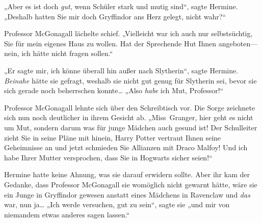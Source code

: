 „Aber es ist doch \emph{gut}, wenn Schüler stark und mutig sind“, sagte Hermine. „Deshalb hatten Sie mir doch Gryffindor ans Herz gelegt, nicht wahr?“

Professor McGonagall lächelte schief. „Vielleicht war ich auch nur selbstsüchtig, Sie für mein eigenes Haus zu wollen. Hat der Sprechende Hut Ihnen angeboten—nein, ich hätte nicht fragen sollen.“

„Er sagte mir, ich könne überall hin außer nach Slytherin“, sagte Hermine. \emph{Beinahe} hätte sie gefragt, weshalb sie nicht gut genug für Slytherin sei, bevor sie sich gerade noch beherrschen konnte… „Also \emph{habe} ich Mut, Professor!“

Professor McGonagall lehnte sich über den Schreibtisch vor. Die Sorge zeichnete sich nun noch deutlicher in ihrem Gesicht ab. „Miss~Granger, hier geht es nicht um Mut, sondern darum was für junge Mädchen auch gesund ist! Der Schulleiter zieht Sie in seine Pläne mit hinein, Harry Potter vertraut Ihnen seine Geheimnisse an und jetzt schmieden Sie Allianzen mit Draco Malfoy! Und ich habe Ihrer Mutter versprochen, dass Sie in Hogwarts sicher seien!“

Hermine hatte keine Ahnung, was sie darauf erwidern sollte. Aber ihr kam der Gedanke, dass Professor McGonagall sie womöglich nicht gewarnt hätte, wäre sie ein Junge in Gryffindor gewesen anstatt eines Mädchens in Ravenclaw und \emph{das} war, nun ja… „Ich werde versuchen, gut zu sein“, sagte sie „und mir von niemandem etwas anderes sagen lassen.“

